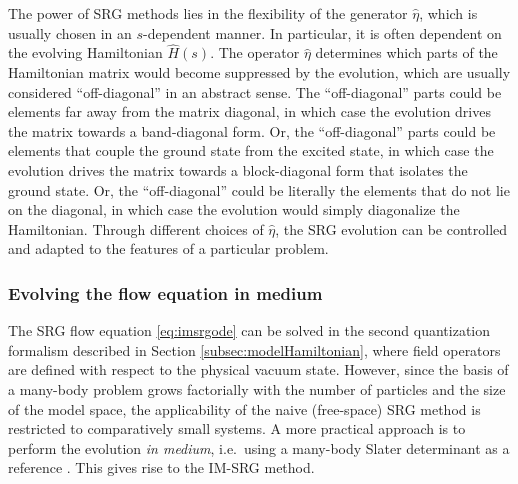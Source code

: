 The power of SRG methods lies in the flexibility of the generator $\hat{\eta}$, which is usually chosen in an $s$-dependent manner.  In particular, it is often dependent on the evolving Hamiltonian $\hat{H}(s)$.  The operator $\hat{\eta}$ determines which parts of the Hamiltonian matrix would become suppressed by the evolution, which are usually considered ``off-diagonal'' in an abstract sense.  The ``off-diagonal'' parts could be elements far away from the matrix diagonal, in which case the evolution drives the matrix towards a band-diagonal form.  Or, the ``off-diagonal'' parts could be elements that couple the ground state from the excited state, in which case the evolution drives the matrix towards a block-diagonal form that isolates the ground state.  Or, the ``off-diagonal'' could be literally the elements that do not lie on the diagonal, in which case the evolution would simply diagonalize the Hamiltonian.  Through different choices of $\hat{\eta}$, the SRG evolution can be controlled and adapted to the features of a particular problem.

\subsubsection{Evolving the flow equation in medium}

The SRG flow equation \eqref{eq:imsrgode} can be solved in the second quantization formalism described in Section \ref{subsec:modelHamiltonian}, where field operators are defined with respect to the physical vacuum state.  However, since the basis of a many-body problem grows factorially with the number of particles and the size of the model space, the applicability of the naive (free-space) SRG method is restricted to comparatively small systems.  A more practical approach is to perform the evolution \textit{in medium}, i.e.\ using a many-body Slater determinant as a reference \cite{kehrein2006flow}.  This gives rise to the IM-SRG method.

